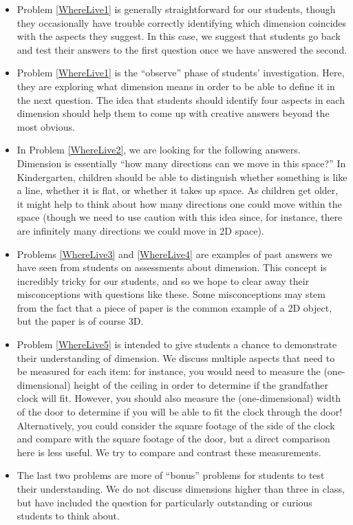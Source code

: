 \documentclass[nooutcomes]{ximera}
\begin{document}
\begin{instructorNotes}
    
\begin{itemize}
    \item Problem \ref{WhereLive1} is generally straightforward for our students, though they occasionally have trouble correctly identifying which dimension coincides with the aspects they suggest.  In this case, we suggest that students go back and test their answers to the first question once we have answered the second.
    \item Problem \ref{WhereLive1} is the ``observe'' phase of students' investigation.  Here, they are exploring what dimension means in order to be able to define it in the next question.  The idea that students should identify four aspects in each dimension should help them to come up with creative answers beyond the most obvious.
    \item In Problem \ref{WhereLive2}, we are looking for the following answers. Dimension is essentially ``how many directions can we move in this space?'' In Kindergarten, children should be able to distinguish whether something is like a line, whether it is flat, or whether it takes up space.  As children get older, it might help to think about how many directions one could move within the space (though we need to use caution with this idea since, for instance, there are infinitely many directions we could move in 2D space).
    \item Problems \ref{WhereLive3} and \ref{WhereLive4} are examples of past answers we have seen from students on assessments about dimension.  This concept is incredibly tricky for our students, and so we hope to clear away their misconceptions with questions like these.  Some misconceptions may stem from the fact that a piece of paper is the common example of a 2D object, but the paper is of course 3D.
    \item Problem \ref{WhereLive5} is intended to give students a chance to demonstrate their understanding of dimension.  We discuss multiple aspects that need to be measured for each item: for instance, you would need to measure the (one-dimensional) height of the ceiling in order to determine if the grandfather clock will fit.  However, you should also measure the (one-dimensional) width of the door to determine if you will be able to fit the clock through the door!  Alternatively, you could consider the square footage of the side of the clock and compare with the square footage of the door, but a direct comparison here is less useful.  We try to compare and contrast these measurements.
    \item The last two problems are more of ``bonus'' problems for students to test their understanding.  We do not discuss dimensions higher than three in class, but have included the question for particularly outstanding or curious students to think about.
\end{itemize}
 
    
    
\end{instructorNotes}
\end{document}
